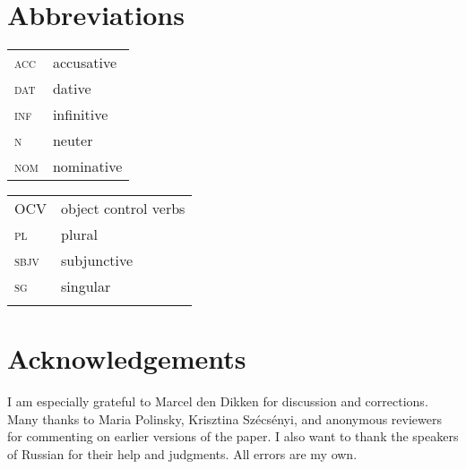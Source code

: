 \documentclass[output=paper,
colorlinks,
citecolor=brown,
newtxmath
]{langscibook}
\begin{document}
\section*{Abbreviations}
\begin{tabularx}{.45\textwidth}{lX}
\textsc{acc}&accusative\\
\textsc{dat}&dative\\
\textsc{inf}&infinitive\\
\textsc{n}&neuter\\
\textsc{nom}&nominative\\
\end{tabularx}
\begin{tabularx}{.45\textwidth}{lX}
OCV&object control verbs\\
\textsc{pl}&plural\\
\textsc{sbjv}&subjunctive\\
\textsc{sg}&singular\\
&\\
\end{tabularx}

\section*{Acknowledgements}

I  am  especially  grateful  to  Marcel  den  Dikken  for  discussion  and corrections. Many thanks to Maria Polinsky, Krisztina Szécsényi, and anonymous reviewers for commenting on earlier versions of the paper. I  also  want  to  thank  the  speakers  of  Russian  for  their  help  and judgments. All errors are my own.

\sloppy
\printbibliography[heading=subbibliography,notkeyword=this]
\end{document}
